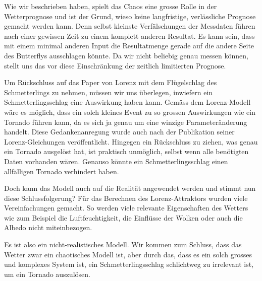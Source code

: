 
Wie wir beschrieben haben, spielt das Chaos eine grosse Rolle in der Wetterprognose und ist der Grund, wieso keine langfristige, verlässliche Prognose gemacht werden kann. Denn selbst kleinste Verfälschungen der Messdaten führen nach einer gewissen Zeit zu einem komplett anderen Resultat. Es kann sein, dass mit einem minimal anderen Input die Resultatmenge gerade auf die andere Seite des Butterflys ausschlagen könnte. Da wir nicht beliebig genau messen können, stellt uns das vor diese Einschränkung der zeitlich limitierten Prognose.

Um Rückschluss auf das Paper von Lorenz mit dem Flügelschlag des Schmetterlings zu nehmen, müssen wir uns überlegen, inwiefern ein Schmetterlingsschlag eine Auswirkung haben kann. Gemäss dem Lorenz-Modell wäre es möglich, dass ein solch kleines Event zu so grossen Auswirkungen wie ein Tornado führen kann, da es sich ja genau um eine winzige Parameteränderung handelt. Diese Gedankenanregung wurde auch nach der Publikation seiner Lorenz-Gleichungen veröffentlicht. Hingegen ein Rückschluss zu ziehen, was genau ein Tornado ausgelöst hat, ist praktisch unmöglich, selbst wenn alle benötigten Daten vorhanden wären. Genauso könnte ein Schmetterlingsschlag einen allfälligen Tornado verhindert haben.

Doch kann das Modell auch auf die Realität angewendet werden und stimmt nun diese Schlussfolgerung? Für das Berechnen des Lorenz-Attraktors wurden viele Vereinfachungen gemacht. So werden viele relevante Eigenschaften des Wetters wie zum Beispiel die Luftfeuchtigkeit, die Einflüsse der Wolken oder auch die Albedo nicht miteinbezogen. 

Es ist also ein nicht-realistisches Modell. Wir kommen zum Schluss, dass das Wetter zwar ein chaotisches Modell ist, aber durch das, dass es ein solch grosses und komplexes System ist, ein Schmetterlingsschlag schlichtweg zu irrelevant ist, um ein Tornado auszulösen. 